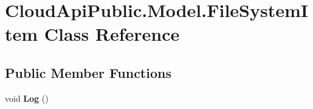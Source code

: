 \hypertarget{class_cloud_api_public_1_1_model_1_1_file_system_item}{\section{Cloud\-Api\-Public.\-Model.\-File\-System\-Item Class Reference}
\label{class_cloud_api_public_1_1_model_1_1_file_system_item}
}
\subsection*{Public Member Functions}
\begin{DoxyCompactItemize}
\item 
\hypertarget{class_cloud_api_public_1_1_model_1_1_file_system_item_a8e4aa0da02e91a9cb65241aa97b7e3dc}{void {\bfseries Log} ()}\label{class_cloud_api_public_1_1_model_1_1_file_system_item_a8e4aa0da02e91a9cb65241aa97b7e3dc}

\end{DoxyCompactItemize}
